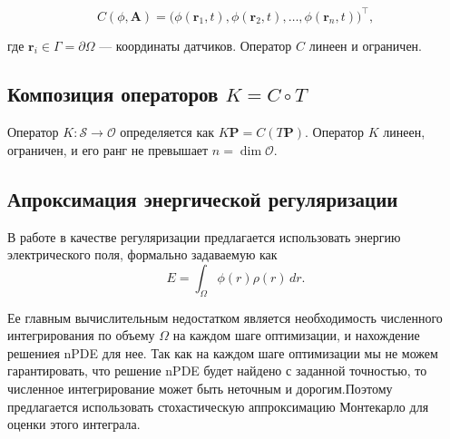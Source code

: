 \documentclass[a4paper,14pt,oneside,openany]{extarticle}
\begin{document}
\begin{equation}
    C(\phi, \mathbf{A}) = \bigl(\phi(\mathbf{r}_1, t), \phi(\mathbf{r}_2, t), \dots, \phi(\mathbf{r}_n, t)\bigr)^\top,
\end{equation}

где $\mathbf{r}_i \in \Gamma = \partial\Omega$ --- координаты датчиков. Оператор $C$ линеен и ограничен.

\subsection{Композиция операторов $K = C \circ T$}
Оператор $K: \mathcal{S} \to \mathcal{O}$ определяется как $K\mathbf{P} = C(T\mathbf{P})$. Оператор $K$ линеен, ограничен, и его ранг не превышает $n = \dim \mathcal{O}$.

\subsection{Апроксимация энергической регуляризации}
\label{subsec:regularization}
В работе в качестве регуляризации предлагается использовать энергию электрического поля, формально задаваемую как
\[ E = \int_{\Omega} \phi(r)\rho(r)\,dr. \]

Ее главным вычислительным недостатком является необходимость численного интегрирования по объему $\Omega$ на каждом шаге оптимизации,
и нахождение решениея nPDE для нее. Так как на каждом шаге оптимизации мы не можем гарантировать, что решение nPDE будет найдено 
с заданной точностью, то численное интегрирование может быть неточным и дорогим.Поэтому предлагается использовать стохастическую
аппроксимацию Монтекарло для оценки этого интеграла.
\end{document}
